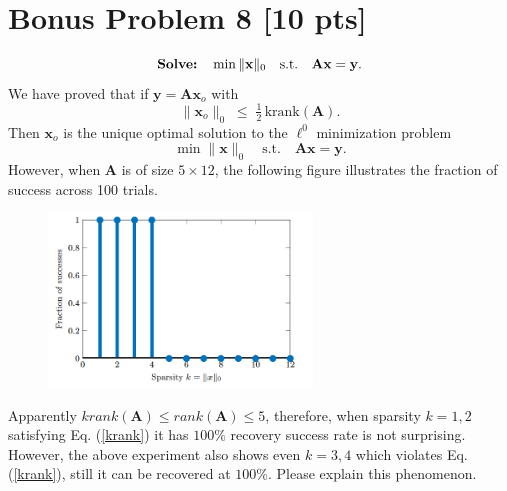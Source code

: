 \documentclass[11pt]{article}
\newcommand{\mtx}[1]{\mathbf{#1}}
\newcommand{\vct}[1]{\mathbf{#1}}
\def \mA {\mtx{A}}
\def \vx {\vct{x}}
\def \vy {\vct{y}}
\begin{document}
\section*{Bonus Problem 8 [10 pts]}
\begin{equation}
	\text{\bf Solve:} \quad \min \|\vx\|_{0} \quad \mbox{s.t.}\quad { \mA \vx = \vy. }
\end{equation}
We have proved that if $\vy = \mA \vx_o$ with
\begin{equation}\label{krank}
	\|\vx_o\|_0 \; \le \; \tfrac{1}{2} \, \mathrm{krank}(\mA).
\end{equation}
Then $\vx_o$ is the unique optimal solution to the  $\ell^0$ minimization problem
\begin{equation}
	\min \|\vx\|_{0} \quad \mbox{s.t.}\quad { \mA \vx = \vy. }
\end{equation}
However, when $\mA$ is of size $5 \times 12$, the following figure illustrates the fraction of success across 100 trials.
\begin{figure}[h!]
	\centering
	\includegraphics[width=7cm]{simulation-L0.png}
\end{figure}    
Apparently $krank(\mA)\le rank(\mA)\le 5$, therefore, when sparsity $k=1, 2$ satisfying Eq. (\ref{krank}) it has $100\%$ recovery success rate is not surprising. However, the above experiment also shows even $k=3, 4$ which violates Eq. (\ref{krank}), still it can be recovered at $100\%$. Please explain this phenomenon.
\end{document}

